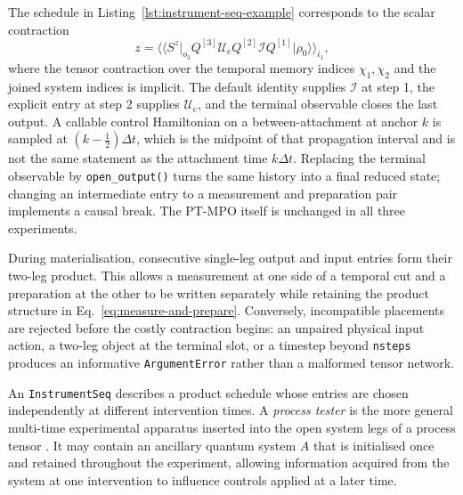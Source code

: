 The schedule in Listing~\ref{lst:instrument-seq-example} corresponds to the scalar contraction
%
\begin{equation}
    z
    = \langle\!\langle S^z\rvert_{o_3}
    Q^{[3]} \mathcal U_{\mathrm c}
    Q^{[2]} \mathcal I
    Q^{[1]} \lvert\rho_0\rangle\!\rangle_{i_1},
    \label{eq:instrument-seq-example}
\end{equation}
%
where the tensor contraction over the temporal memory indices \(\chi_1,\chi_2\) and the joined system indices is implicit.
The default identity supplies \(\mathcal I\) at step 1, the explicit entry at step 2 supplies \(\mathcal U_{\mathrm c}\), and the terminal observable closes the last output.
A callable control Hamiltonian on a between-attachment at anchor \(k\) is sampled at \((k-\tfrac12)\Delta t\), which is the midpoint of that propagation interval and is not the same statement as the attachment time \(k\Delta t\).
Replacing the terminal observable by \texttt{open\_output()} turns the same history into a final reduced state; changing an intermediate entry to a measurement and preparation pair implements a causal break.
The
PT-MPO itself is unchanged in all three experiments.

During materialisation, consecutive single-leg output and input entries form their two-leg product.
This allows a measurement at one side of a temporal cut and a preparation at the other to be written separately while retaining the product structure in Eq.~\eqref{eq:measure-and-prepare}.
Conversely, incompatible placements are rejected before the costly contraction begins: an unpaired physical input action, a two-leg object at the terminal slot, or a timestep beyond \texttt{nsteps} produces an informative \texttt{ArgumentError} rather than a malformed tensor network.

\label{subsec:process-testers}

An \texttt{InstrumentSeq} describes a product schedule whose entries are chosen independently at different intervention times.
A \emph{process tester} is the more general multi-time experimental apparatus inserted into the open system legs of a process tensor \cite{Chiribella2009,White2025NonMarkovian}.
It may contain an ancillary quantum system \(A\) that is initialised once and retained throughout the experiment, allowing information acquired from the system at one intervention to influence controls applied at a later time.

